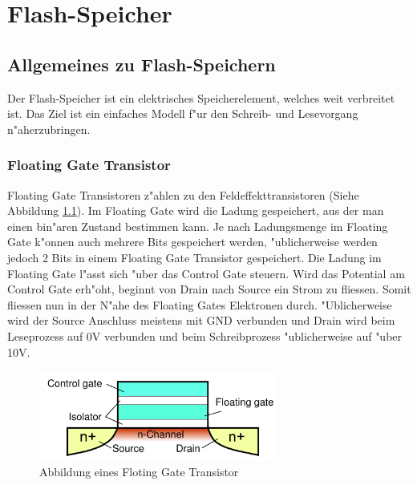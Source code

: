 \chapter{Flash-Speicher\label{chapter:flash}}
\begin{refsection}

\section{Allgemeines zu Flash-Speichern}
Der Flash-Speicher ist ein elektrisches Speicherelement, welches
weit verbreitet ist.
Das Ziel ist ein einfaches Modell f"ur den Schreib- und Lesevorgang
n"aherzubringen.

\subsection{Floating Gate Transistor}
Floating Gate Transistoren z"ahlen zu den Feldeffekttransistoren
(Siehe Abbildung \ref{skript:Floatinggatetransistor}).
Im Floating Gate wird die Ladung gespeichert, aus der man einen bin"aren
Zustand bestimmen kann.
Je nach Ladungsmenge im Floating Gate k"onnen auch mehrere Bits gespeichert
werden, "ublicherweise werden jedoch 2 Bits in einem Floating Gate
Transistor gespeichert.
Die Ladung im Floating Gate l"asst sich "uber das Control Gate steuern.
Wird das Potential am Control Gate erh"oht, beginnt von Drain nach
Source ein Strom zu fliessen.
Somit fliessen nun in der N"ahe des Floating Gates Elektronen durch.
"Ublicherweise wird der Source Anschluss meistens mit GND verbunden und
Drain wird beim Leseprozess auf 0V verbunden und beim Schreibprozess
"ublicherweise auf "uber 10V.

\begin{figure}
\centering
\includegraphics[width=0.7\textwidth]{flash/graphics/Floatinggate.pdf}
\caption{Abbildung eines Floting Gate Transistor \cite{flash:floatinggate}}
\label{skript:Floatinggatetransistor}
\end{figure}


\end{refsection}
